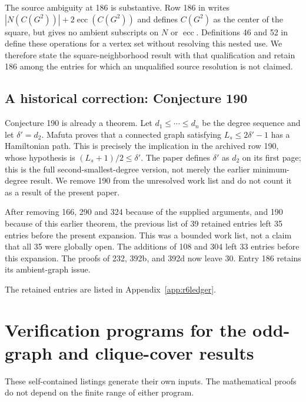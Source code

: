 \documentclass[11pt,a4paper]{article}
\theoremstyle{remark}
\begin{document}
The source ambiguity at 186 is substantive. Row 186 in \cite{Archive} writes
$|N(C(G^2))|+2\operatorname{ecc}(C(G^2))$ and defines $C(G^2)$ as the
center of the square, but gives no ambient subscripts on $N$ or
$\operatorname{ecc}$. Definitions 46 and 52 in \cite{Glossary} define these
operations for a vertex set without resolving this nested use. We therefore
state the square-neighborhood result with that qualification and retain 186
among the entries for which an unqualified source resolution is not claimed.

\subsection{A historical correction: Conjecture 190}
Conjecture 190 is already a theorem. Let $d_1\le\cdots\le d_n$ be the
degree sequence and let $\delta'=d_2$. Mafuta \cite[Theorem 2.1]{Mafuta24}
proves that a connected graph satisfying $L_s\le2\delta'-1$ has a
Hamiltonian path. This is precisely the implication in the archived row 190,
whose hypothesis is $(L_s+1)/2\le\delta'$. The paper defines $\delta'$ as
$d_2$ on its first page; this is the full second-smallest-degree version,
not merely the earlier minimum-degree result. We remove 190 from the
unresolved work list and do not count it as a result of the present paper.

After removing 166, 290 and 324 because of the supplied arguments, and 190
because of this earlier theorem, the previous list of 39 retained entries
left 35 entries before the present expansion. This was a bounded work list,
not a claim that all 35 were globally open. The additions of 108 and 304
left 33 entries before this expansion. The proofs of 232, 392b, and
392d now leave 30. Entry 186 retains its ambient-graph issue.

The retained entries are listed in Appendix~\ref{app:r6ledger}.


\section{Verification programs for the odd-graph and clique-cover results}
\label{r8:programs}
These self-contained listings generate their own inputs. The mathematical
proofs do not depend on the finite range of either program.
\end{document}
